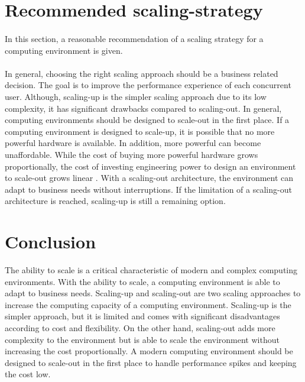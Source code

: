 \documentclass{article}
\begin{document}
\section{Recommended scaling-strategy}
\paragraph{}
In this section, a reasonable recommendation of a scaling strategy for a computing environment is given.


\paragraph{}
In general, choosing the right scaling approach should be a business related decision. The goal is to improve the performance experience of each concurrent user.
Although, scaling-up is the simpler scaling approach due to its low complexity, it has significant drawbacks compared to scaling-out. In general, computing environments should be designed to scale-out in the first place. 
If a computing environment is designed to scale-up, it is possible that no more powerful hardware is available. In addition, more powerful can become unaffordable.
While the cost of buying more powerful hardware grows proportionally, the cost of investing engineering power to design an environment to scale-out grows linear \cite{Abbot2011ScalabilityRules}. 
With a scaling-out architecture, the environment can adapt to business needs without interruptions. If the limitation of a scaling-out architecture is reached, scaling-up is still a remaining option.


\section{Conclusion}
The ability to scale is a critical characteristic of modern and complex computing environments. With the ability to scale, a computing environment is able to adapt to business needs. Scaling-up and scaling-out are two scaling approaches to increase the computing capacity of a computing environment. Scaling-up is the simpler approach, but it is limited and comes with significant disadvantages according to cost and flexibility. On the other hand, scaling-out adds more complexity to the environment but is able to scale the environment without increasing the cost proportionally. A modern computing environment should be designed to scale-out in the first place to handle performance spikes and keeping the cost low.




\end{document}
